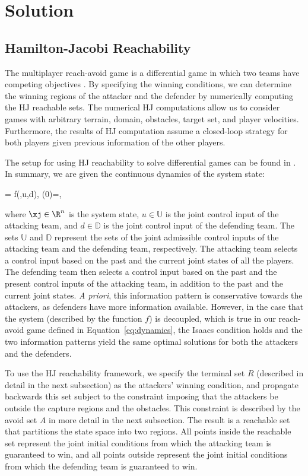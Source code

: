 \section{Solution} \label{sec:solution}
\subsection{Hamilton-Jacobi Reachability} \label{subsec:hj_background}
The multiplayer reach-avoid game is a differential game in which two teams have competing objectives \cite{b:basar-olsder-1999}. By specifying the winning conditions, we can determine the winning regions of the attacker and the defender by numerically computing the HJ reachable sets. The numerical HJ computations allow us to consider games with arbitrary terrain, domain, obstacles, target set, and player velocities. Furthermore, the results of HJ computation assume a closed-loop strategy for both players given previous information of the other players.

The setup for using HJ reachability to solve differential games can be found in \cite{j:mitchell-TAC-2005, LSToolbox, Huang2011}. In summary, we are given the continuous dynamics of the system state:

\bq
\dxj = f(\xj,u,d), \xj(0)=\xjn,
\eq

\noindent where $\xj\in\R^n$ is the system state, $u\in\mathbb{U}$ is the joint control input of the attacking team, and $d\in\mathbb{D}$ is the joint control input of the defending team. The sets $\mathbb{U}$ and $\mathbb{D}$ represent the sets of the joint admissible control inputs of the attacking team and the defending team, respectively. The attacking team selects a control input based on the past and the current joint states of all the players. The defending team then selects a control input based on the past and the present control inputs of the attacking team, in addition to
the past and the current joint states. \textit{A priori}, this information pattern is conservative towards the attackers, as defenders have more information available. However, in the case that the system (described by the function $f$) is decoupled, which is
true in our reach-avoid game defined in Equation~\eqref{eq:dynamics}, the Isaacs condition \cite{b:isaacs-1967} holds and the two information patterns yield the same optimal solutions for both the attackers and the defenders.

To use the HJ reachability framework, we specify the terminal set $R$ (described in detail in the next subsection) as the attackers' winning condition, and propagate backwards this set subject to the constraint imposing that the attackers be outside the capture regions and the obstacles. This constraint is described by the avoid set $A$ in more detail in the next subsection. The result is a reachable set that partitions the state space into two regions. All points inside the reachable set represent the joint initial conditions from which the attacking team is guaranteed to win, and all points outside represent the joint initial conditions from which the defending team is guaranteed to win.

